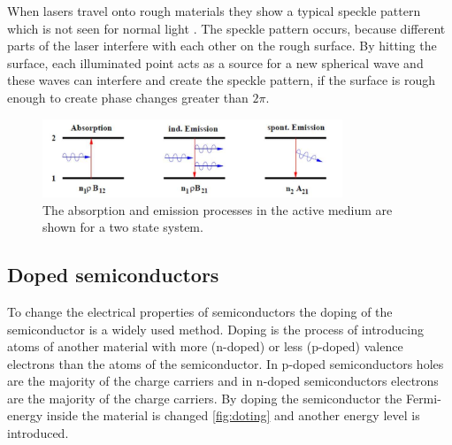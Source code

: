 When lasers travel onto rough materials they show a typical speckle pattern which is not seen for normal light \cite{speckle}.
The speckle pattern occurs, because different parts of the laser interfere with each other on the rough surface.
By hitting the surface, each illuminated point acts as a source for a new spherical wave and these waves can interfere and create the speckle pattern, if the surface is rough enough to create phase changes greater than $2\pi$.

\begin{figure}[ht]
    \center
    \includegraphics[width=0.8\textwidth]{bilder/emission.jpg}
    \caption{The absorption and emission processes in the active medium are shown for a two state system. \cite{anleitungHeNe}}
    \label{fig:emission}
\end{figure}

\subsection{Doped semiconductors}
\label{sec:doting}
To change the electrical properties of semiconductors the doping of the semiconductor is a widely used method.
Doping is the process of introducing atoms of another material with more (n-doped) or less (p-doped) valence electrons than the atoms of the semiconductor.
In p-doped semiconductors holes are the majority of the charge carriers and in n-doped semiconductors electrons are the majority of the charge carriers.
By doping the semiconductor the Fermi-energy inside the material is changed \ref{fig:doting} and another energy level is introduced.

